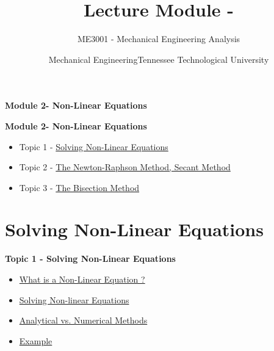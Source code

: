 \documentclass[fleqn]{ltx-talk} %
\author{ME3001 - Mechanical Engineering Analysis}
\title{Lecture Module - \moduletitle}
\date{Mechanical Engineering\vspc Tennessee Technological University}
\newcommand{\MNUM}{2\hspace{2mm}} %
\newcommand{\moduletitle}{Non-Linear Equations}
\newcommand{\sectionItitle}{Solving Non-Linear Equations}
\newcommand{\sectionIItitle}{The Newton-Raphson Method, Secant Method}
\newcommand{\sectionIIItitle}{The Bisection Method}
\newcommand{\sectionIsubsectionItitle}{What is a Non-Linear Equation ?}
\newcommand{\sectionIsubsectionIItitle}{Solving Non-linear Equations}
\newcommand{\sectionIsubsectionIIItitle}{Analytical vs. Numerical Methods}
\newcommand{\sectionIsubsectionIVtitle}{Example}
\begin{document}
	\lstset{language=MATLAB,basicstyle=\ttfamily\small,showstringspaces=false}

        \begin{frame}
            \begin{framed}\Large\textbf{Module \MNUM - \moduletitle}\end{framed}
        \end{frame}


	\begin{frame} 
		\large \textbf{Module \MNUM - \moduletitle} \vspace{3mm}\\

		\begin{itemize}
			\item Topic 1 - \hyperref[sectionI]{\sectionItitle} \vspc %
			\item Topic 2 - \hyperref[sectionII]{\sectionIItitle} \vspc %
			\item Topic 3 - \hyperref[sectionIII]{\sectionIIItitle} \vspc %
		\end{itemize}

	\end{frame}

	\section{\sectionItitle}\label{sectionI}

		\begin{frame} 
			\large \textbf{Topic 1 - \sectionItitle} \vspace{3mm}\\

			\begin{itemize}
				\item \hyperref[sectionIsubsectionI]{\sectionIsubsectionItitle} \vspc %
				\item \hyperref[sectionIsubsectionII]{\sectionIsubsectionIItitle} \vspc %
				\item \hyperref[sectionIsubsectionIII]{\sectionIsubsectionIIItitle} \vspc %
				\item \hyperref[sectionIsubsectionIV]{\sectionIsubsectionIVtitle} \vspc %
			\end{itemize}
		\end{frame}
		
\end{document}
